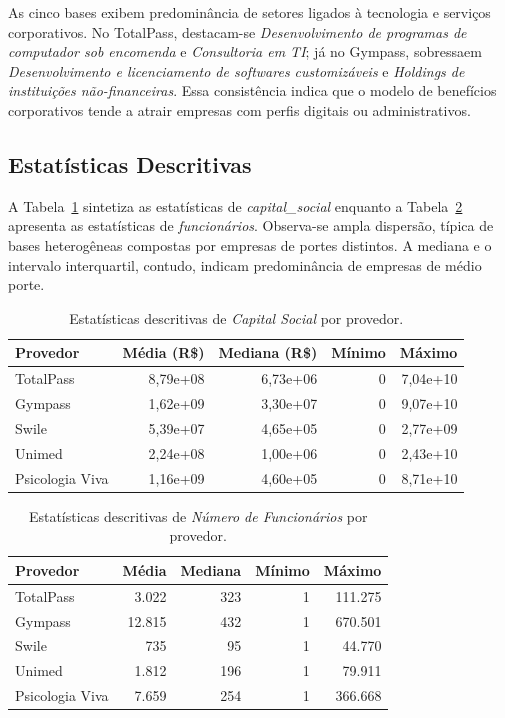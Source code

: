 As cinco bases exibem predominância de setores ligados à tecnologia e serviços corporativos. No TotalPass, destacam-se \textit{Desenvolvimento de programas de computador sob encomenda} e \textit{Consultoria em TI}; já no Gympass, sobressaem \textit{Desenvolvimento e licenciamento de softwares customizáveis} e \textit{Holdings de instituições não-financeiras}. Essa consistência indica que o modelo de benefícios corporativos tende a atrair empresas com perfis digitais ou administrativos.

\subsection{Estatísticas Descritivas}

A Tabela~\ref{tab:7_3a_capital} sintetiza as estatísticas de \textit{capital\_social} enquanto a Tabela~\ref{tab:7_3b_funcionarios} apresenta as estatísticas de \textit{funcionários}. Observa-se ampla dispersão, típica de bases heterogêneas compostas por empresas de portes distintos. A mediana e o intervalo interquartil, contudo, indicam predominância de empresas de médio porte.

\begin{table}[H]
\centering
\caption{Estatísticas descritivas de \textit{Capital Social} por provedor.}
\label{tab:7_3a_capital}
\begin{tabular}{lrrrr}
\toprule
\textbf{Provedor} & \textbf{Média (R\$)} & \textbf{Mediana (R\$)} & \textbf{Mínimo} & \textbf{Máximo} \\
\midrule
TotalPass & 8,79e+08 & 6,73e+06 & 0 & 7,04e+10 \\
Gympass & 1,62e+09 & 3,30e+07 & 0 & 9,07e+10 \\
Swile & 5,39e+07 & 4,65e+05 & 0 & 2,77e+09 \\
Unimed & 2,24e+08 & 1,00e+06 & 0 & 2,43e+10 \\
Psicologia Viva & 1,16e+09 & 4,60e+05 & 0 & 8,71e+10 \\
\bottomrule
\end{tabular}
\end{table}

\begin{table}[H]
\centering
\caption{Estatísticas descritivas de \textit{Número de Funcionários} por provedor.}
\label{tab:7_3b_funcionarios}
\begin{tabular}{lrrrr}
\toprule
\textbf{Provedor} & \textbf{Média} & \textbf{Mediana} & \textbf{Mínimo} & \textbf{Máximo} \\
\midrule
TotalPass & 3.022 & 323 & 1 & 111.275 \\
Gympass & 12.815 & 432 & 1 & 670.501 \\
Swile & 735 & 95 & 1 & 44.770 \\
Unimed & 1.812 & 196 & 1 & 79.911 \\
Psicologia Viva & 7.659 & 254 & 1 & 366.668 \\
\bottomrule
\end{tabular}
\end{table}

